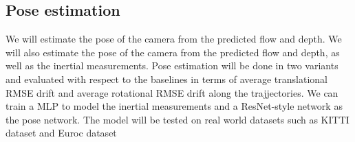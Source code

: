 \documentclass[10pt,letterpaper]{article}
\begin{document}
\subsection*{Pose estimation}
We will estimate the pose of the camera from the predicted flow and depth. We will also estimate the pose of the camera from the predicted flow and depth, as well as the inertial measurements. Pose estimation will be done in two variants and evaluated with respect to the baselines in terms of  average translational RMSE drift and average rotational RMSE drift along the trajjectories. We can train a MLP to model the inertial measurements and a ResNet-style network as the pose network. The model will be tested on real world datasets such as KITTI dataset \cite{kitti} and Euroc dataset \cite{euroc}
\end{document}
